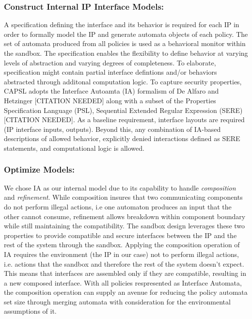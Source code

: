 \documentclass[sigconf]{acmart}
\theoremstyle{plain}
\theoremstyle{remark}
\begin{document}
\subsubsection{Construct Internal IP Interface Models:}
A specification defining the interface and its behavior is required for each IP in order to formally model the IP and generate automata objects of each policy. The set of automata produced from all policies is used as a behavioral monitor within the sandbox. The specification enables the flexibility to define behavior at varying levels of abstraction and varying degrees of completeness. To elaborate, specification might contain partial interface defintions and/or behaviors abstracted through additonal computation logic. To capture security properties, CAPSL adopts the Interface Autoamta (IA) formalism of De Alfaro and Hetzinger [CITATION NEEDED] along with a subset of the Properties Specification Language (PSL), Sequential Extended Regular Expression (SERE) [CITATION NEEDED]. As a baseline requirement, interface layouts are required (IP interface inputs, outputs). Beyond this, any combination of IA-based descriptions of allowed behavior, explicitly denied interactions defined as SERE statements, and computational logic is allowed.


\subsubsection{Optimize Models:}
We chose IA as our internal model due to its capability to handle \textit{composition} and \textit{refinement}. While composition insures that two communicating components do not perform illegal actions, i.e one automaton produces an input that the other cannot consume, refinement allows breakdown within component boundary while still maintaining the compatibility. The sandbox design leverages these two properties to provide compatible and secure interfaces between the IP and the rest of the system through the sandbox. Applying the composition operation of IA requires the environment (the IP in our case) not to perform illegal actions, i.e. actions that the sandbox and therefore the rest of  the system doesn't expect. This means that interfaces are assembled only if they are compatible, resulting in a new composed interface. With all policies respresented as Interface Automata, the composition operation can supply an avenue for reducing the policy automata set size through merging automata with consideration for the environmental assumptions of it.
\end{document}
